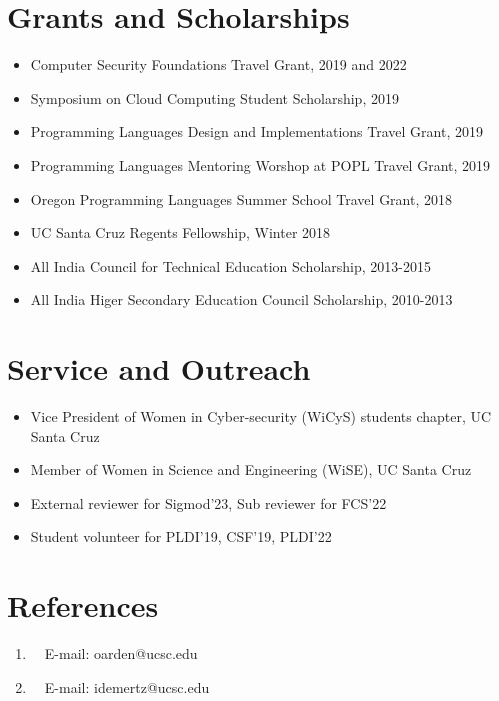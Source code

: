 \documentclass[9pt,a4paper]{moderncv}
\begin{document}
\section{Grants and Scholarships} 
\begin{itemize}
\item Computer Security Foundations Travel Grant, 2019 and 2022 
\item Symposium on Cloud Computing Student Scholarship, 2019
\item Programming Languages Design and Implementations Travel Grant, 2019
\item Programming Languages Mentoring Worshop at POPL Travel Grant, 2019
\item Oregon Programming Languages Summer School Travel Grant, 2018
\item UC Santa Cruz Regents Fellowship, Winter 2018
\item All India Council for Technical Education Scholarship, 2013-2015
\item All India Higer Secondary Education Council Scholarship, 2010-2013
\end{itemize}
\section{Service and Outreach}
\begin{itemize}
\item Vice President of Women in Cyber-security (WiCyS) students chapter, UC Santa Cruz
\item Member of Women in Science and Engineering (WiSE), UC Santa Cruz
\item External reviewer for Sigmod'23, Sub reviewer for FCS'22
\item Student volunteer for PLDI'19, CSF'19, PLDI'22
\end{itemize}
\section{References}
\begin{enumerate}
\item \underline{} 
~~E-mail: oarden@ucsc.edu
\item \underline{} 
~~E-mail: idemertz@ucsc.edu 
\end{enumerate}
\end{document}
